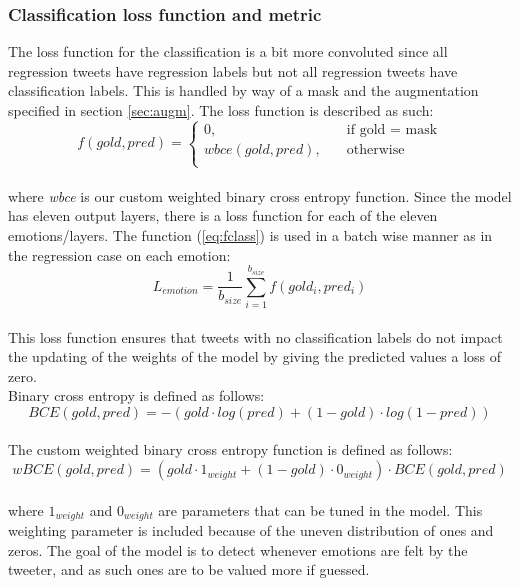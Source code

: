 \subsubsection{Classification loss function and metric}
The loss function for the classification is a bit more convoluted since all regression tweets have regression labels but not all regression tweets have classification labels. This is handled by way of a mask and the augmentation specified in section \ref{sec:augm}. The loss function is described as such:\\
\begin{equation} \label{eq:fclass}
f(gold,pred) =
     \begin{cases}
       0, &\quad\text{if gold = mask}\\
       wbce(gold,pred), &\quad\text{otherwise} \\
     \end{cases}
\end{equation}\\
where \textit{wbce} is our custom weighted binary cross entropy function. Since the model has eleven output layers, there is a loss function for each of the eleven emotions/layers. The function (\ref{eq:fclass}) is used in a batch wise manner as in the regression case on each emotion:\\
\begin{equation} \label{eq:lemotion}
L_{emotion}=\dfrac{1}{b_{size}} \sum_{i=1}^{b_{size}} f(gold_i, pred_i)
\end{equation}\\
 This loss function ensures that tweets with no classification labels do not impact the updating of the weights of the model by giving the predicted values a loss of zero.\\
Binary cross entropy is defined as follows:\\
\begin{equation}
BCE(gold,pred) = -(gold \cdot log(pred)+(1-gold) \cdot log(1-pred))
\end{equation}\\
The custom weighted binary cross entropy function is defined as follows:\\
\begin{equation} \label{eq:wBCE}
wBCE(gold,pred) = (gold \cdot 1_{weight} + (1-gold) \cdot 0_{weight}) \cdot BCE(gold, pred)
\end{equation}\\
where $1_{weight}$ and $0_{weight}$ are parameters that can be tuned in the model. This weighting parameter is included because of the uneven distribution of ones and zeros. The goal of the model is to detect whenever emotions are felt by the tweeter, and as such ones are to be valued more if guessed.  \\ \\
